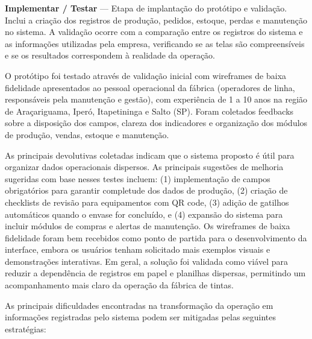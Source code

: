 \documentclass[12pt,a4paper]{article}
\begin{document}
\textbf{Implementar / Testar} — Etapa de implantação do protótipo e validação. Inclui a criação dos registros de produção, pedidos, estoque, perdas e manutenção no sistema. A validação ocorre com a comparação entre os registros do sistema e as informações utilizadas pela empresa, verificando se as telas são compreensíveis e se os resultados correspondem à realidade da operação. 

O protótipo foi testado através de validação inicial com wireframes de baixa fidelidade apresentados ao pessoal operacional da fábrica (operadores de linha, responsáveis pela manutenção e gestão), com experiência de 1 a 10 anos na região de Araçariguama, Iperó, Itapetininga e Salto (SP). Foram coletados feedbacks sobre a disposição dos campos, clareza dos indicadores e organização dos módulos de produção, vendas, estoque e manutenção.

As principais devolutivas coletadas indicam que o sistema proposto é útil para organizar dados operacionais dispersos. As principais sugestões de melhoria sugeridas com base nesses testes incluem: (1) implementação de campos obrigatórios para garantir completude dos dados de produção, (2) criação de checklists de revisão para equipamentos com QR code, (3) adição de gatilhos automáticos quando o envase for concluído, e (4) expansão do sistema para incluir módulos de compras e alertas de manutenção. Os wireframes de baixa fidelidade foram bem recebidos como ponto de partida para o desenvolvimento da interface, embora os usuários tenham solicitado mais exemplos visuais e demonstrações interativas. Em geral, a solução foi validada como viável para reduzir a dependência de registros em papel e planilhas dispersas, permitindo um acompanhamento mais claro da operação da fábrica de tintas.

As principais dificuldades encontradas na transformação da operação em informações registradas pelo sistema podem ser mitigadas pelas seguintes estratégias:
\end{document}
